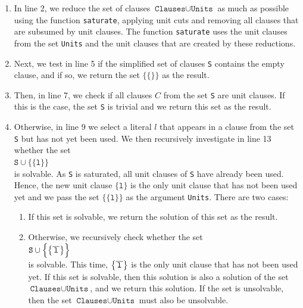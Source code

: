 \begin{enumerate}
\item In line 2, we reduce the set of clauses $\texttt{Clauses} \cup \texttt{Units}$ as much as possible using the
      function \texttt{saturate}, applying unit cuts and removing all clauses that are subsumed by unit clauses.
      The function \texttt{saturate} uses the unit clauses from the set \texttt{Units} and the unit clauses that
      are created by these reductions.
\item Next, we test in line 5 if the simplified set of clauses \texttt{S}
      contains the empty clause, and if so, we return the set 
      $\bigl\{\{\}\bigr\}$ as the result.
\item Then, in line 7, we check if all clauses $C$ from the set
      \texttt{S} are unit clauses. If this is the case,
      the set \texttt{S} is trivial and we return this set as the result.
\item Otherwise, in line 9 we select a literal $l$ that appears in a clause from the set \texttt{S} 
      but has not yet been used.
      We then recursively investigate in line 13 whether the set \\[0.2cm]
      \hspace*{1.3cm} 
      $\texttt{S} \cup \bigl\{\{\texttt{l}\}\bigr\}$ 
      \\[0.2cm]
      is solvable.  As \texttt{S} is saturated, all unit clauses of \texttt{S} have already been used.  Hence,
      the new unit clause $\{\texttt{l}\}$ is the only unit clause that has not been used yet and we pass the
      set $\bigl\{\{\texttt{l}\}\bigr\}$ as the argument \texttt{Units}.  There are two cases:
      \begin{enumerate}
      \item If this set is solvable, we return the solution of this set as the result.

      \item Otherwise, we recursively check whether the set
            \\[0.2cm]
            \hspace*{1.3cm}
            $\texttt{S} \cup \Bigl\{ \bigl\{ \overline{\,\texttt{l}\,} \bigr\} \Bigr\}$
            \\[0.2cm]
            is solvable.  This time, $\bigl\{\overline{\,\texttt{l}\,}\bigr\}$ is the only unit clause that has not
            been used yet.  If this set is solvable, then this solution is also a
            solution of the set $\texttt{Clauses} \cup \texttt{Units}$, and we return this solution. If the
            set is unsolvable, then the set $\texttt{Clauses} \cup \texttt{Units}$ must also be unsolvable.
      \end{enumerate}
\end{enumerate}

